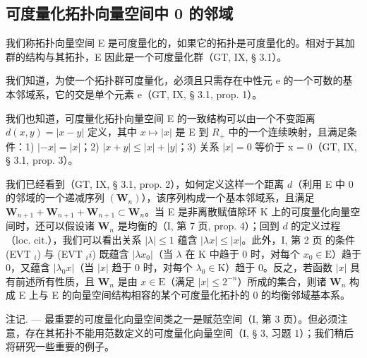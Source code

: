 \subsection{可度量化拓扑向量空间中 0 的邻域}

我们称拓扑向量空间 E 是可度量化的，如果它的拓扑是可度量化的。相对于其加群的结构与其拓扑，E 因此是一个可度量化群（GT, IX, § 3.1）。

我们知道，为使一个拓扑群可度量化，必须且只需存在中性元 e 的一个可数的基本邻域系，它的交是单个元素 e（GT, IX, § 3.1, prop. 1）。

我们也知道，可度量化拓扑向量空间 E 的一致结构可以由一个不变距离 \(d(x, y) = |x - y|\) 定义，其中 \(x \mapsto |x|\) 是 E 到 \(R_{+}\) 中的一个连续映射，且满足条件：1) \(|-x| = |x|\)；2) \(|x + y| \leqslant |x| + |y|\)；3) 关系 \(|x| = 0\) 等价于 x = 0（GT, IX, § 3.1, prop. 3）。

我们已经看到（GT, IX, § 3.1, prop. 2），如何定义这样一个距离 \(d\)（利用 E 中 0 的邻域的一个递减序列 \((\mathbf{W}_n)\)），该序列构成一个基本邻域系，且满足 \(\mathbf{W}_{n+1} + \mathbf{W}_{n+1} + \mathbf{W}_{n+1} \subset \mathbf{W}_n\)。当 E 是非离散赋值除环 K 上的可度量化向量空间时，还可以假设诸 \(\mathbf{W}_n\) 是均衡的（I, 第 7 页, prop. 4）；回到 \(d\) 的定义过程（loc. cit.），我们可以看出关系 \(|\lambda| \leqslant 1\) 蕴含 \(|\lambda x| \leqslant |x|\)。此外，I, 第 2 页 的条件 (EVT \(_i\)) 与 (EVT \(_ii\)) 既蕴含 \(|\lambda x_0|\)（当 \(\lambda\) 在 K 中趋于 0 时，对每个 \(x_0 \in \mathrm{E}\)）趋于 0，又蕴含 \(|\lambda_0 x|\)（当 \(|x|\) 趋于 0 时，对每个 \(\lambda_0 \in \mathrm{K}\)）趋于 0。反之，若函数 \(|x|\) 具有前述所有性质，且 \(\mathbf{W}_n\) 是由 \(x \in \mathrm{E}\)（满足 \(|x| \leqslant 2^{-n}\)）所成的集合，则诸 \(\mathbf{W}_n\) 构成 E 上与 E 的向量空间结构相容的某个可度量化拓扑的 0 的均衡邻域基本系。

注记. --- 最重要的可度量化向量空间类之一是赋范空间（I, 第 3 页）。但必须注意，存在其拓扑不能用范数定义的可度量化向量空间（I, § 3, 习题 1）；我们稍后将研究一些重要的例子。

